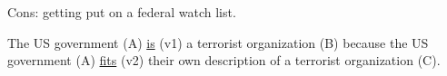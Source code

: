 \documentclass[12pt]{article}
\begin{document}
Cons: getting put on a federal watch list.

The US government (A) \uline{is} (v1) a terrorist organization (B) because the US government (A) \uline{fits} (v2) their own description of a terrorist organization (C).


\end{document}
